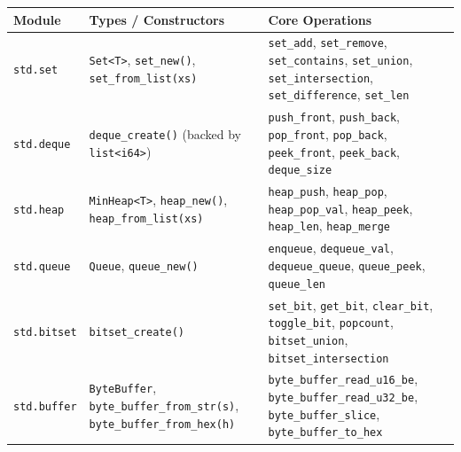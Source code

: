 \documentclass[
  english,
  oneside]{book}
\newcounter{none} %
\begin{document}
{\def\LTcaptype{none} %
\begin{longtable}[]{@{}
  >{\raggedright\arraybackslash}p{}
  >{\raggedright\arraybackslash}p{}
  >{\raggedright\arraybackslash}p{}@{}}
\toprule\noalign{}
\begin{minipage}[b]{\linewidth}\raggedright
Module
\end{minipage} & \begin{minipage}[b]{\linewidth}\raggedright
Types / Constructors
\end{minipage} & \begin{minipage}[b]{\linewidth}\raggedright
Core Operations
\end{minipage} \\
\midrule\noalign{}
\endhead
\bottomrule\noalign{}
\endlastfoot
\texttt{std.set} & \texttt{Set\textless{}T\textgreater{}},
\texttt{set\_new()}, \texttt{set\_from\_list(xs)} & \texttt{set\_add},
\texttt{set\_remove}, \texttt{set\_contains}, \texttt{set\_union},
\texttt{set\_intersection}, \texttt{set\_difference},
\texttt{set\_len} \\
\texttt{std.deque} & \texttt{deque\_create()} (backed by
\texttt{list\textless{}i64\textgreater{}}) & \texttt{push\_front},
\texttt{push\_back}, \texttt{pop\_front}, \texttt{pop\_back},
\texttt{peek\_front}, \texttt{peek\_back}, \texttt{deque\_size} \\
\texttt{std.heap} & \texttt{MinHeap\textless{}T\textgreater{}},
\texttt{heap\_new()}, \texttt{heap\_from\_list(xs)} &
\texttt{heap\_push}, \texttt{heap\_pop}, \texttt{heap\_pop\_val},
\texttt{heap\_peek}, \texttt{heap\_len}, \texttt{heap\_merge} \\
\texttt{std.queue} & \texttt{Queue}, \texttt{queue\_new()} &
\texttt{enqueue}, \texttt{dequeue\_val}, \texttt{dequeue\_queue},
\texttt{queue\_peek}, \texttt{queue\_len} \\
\texttt{std.bitset} & \texttt{bitset\_create()} & \texttt{set\_bit},
\texttt{get\_bit}, \texttt{clear\_bit}, \texttt{toggle\_bit},
\texttt{popcount}, \texttt{bitset\_union},
\texttt{bitset\_intersection} \\
\texttt{std.buffer} & \texttt{ByteBuffer},
\texttt{byte\_buffer\_from\_str(s)}, \texttt{byte\_buffer\_from\_hex(h)}
& \texttt{byte\_buffer\_read\_u16\_be},
\texttt{byte\_buffer\_read\_u32\_be}, \texttt{byte\_buffer\_slice},
\texttt{byte\_buffer\_to\_hex} \\
\end{longtable}
}
\end{document}
